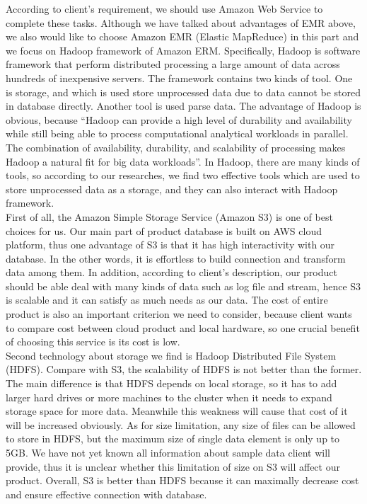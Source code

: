 \documentclass[10pt,draftclsnofoot,onecolumn,journal,compsoc]{IEEEtran}
\begin{document}
        \noindent According to client’s requirement, we should use Amazon Web Service to complete these tasks. Although we have talked about advantages of EMR above, we also would like to choose Amazon EMR (Elastic MapReduce) in this part and we focus on Hadoop framework of Amazon ERM. Specifically, Hadoop is software framework that perform distributed processing a large amount of data across hundreds of inexpensive servers\cite{Z1}. The framework contains two kinds of tool. One is storage, and which is used store unprocessed data due to data cannot be stored in database directly. Another tool is used parse data. The advantage of Hadoop is obvious, because “Hadoop can provide a high level of durability and availability while still being able to process computational analytical workloads in parallel. The combination of availability, durability, and scalability of processing makes Hadoop a natural fit for big data workloads”\cite{Z2}. In Hadoop, there are many kinds of tools, so according to our researches, we find two effective tools which are used to store unprocessed data as a storage, and they can also interact with Hadoop framework.\\ 

        \noindent First of all, the Amazon Simple Storage Service (Amazon S3) is one of best choices for us. Our main part of product database is built on AWS cloud platform, thus one advantage of S3 is that it has high interactivity with our database. In the other words, it is effortless to build connection and transform data among them. In addition, according to client’s description, our product should be able deal with many kinds of data such as log file and stream, hence S3 is scalable and it can satisfy as much needs as our data. The cost of entire product is also an important criterion we need to consider, because client wants to compare cost between cloud product and local hardware, so one crucial benefit of choosing this service is its cost is low.\\

        \noindent Second technology about storage we find is Hadoop Distributed File System (HDFS). Compare with S3, the scalability of HDFS is not better than the former. The main difference is that HDFS depends on local storage, so it has to add larger hard drives or more machines to the cluster when it needs to expand storage space for more data\cite{Z3}. Meanwhile this weakness will cause that cost of it will be increased obviously. As for size limitation, any size of files can be allowed to store in HDFS, but the maximum size of single data element is only up to 5GB. We have not yet known all information about sample data client will provide, thus it is unclear whether this limitation of size on S3 will affect our product. Overall, S3 is better than HDFS because it can maximally decrease cost and ensure effective connection with database. 
\end{document}
